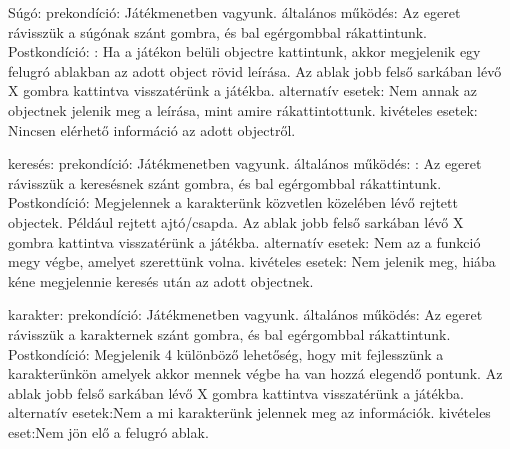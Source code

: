 Súgó:
prekondíció: Játékmenetben vagyunk.
általános működés: Az egeret rávisszük a súgónak szánt gombra, és bal egérgombbal rákattintunk.
Postkondíció: : Ha a játékon belüli objectre kattintunk, akkor megjelenik egy felugró ablakban az adott object rövid leírása. Az ablak jobb felső sarkában lévő X gombra kattintva visszatérünk a játékba.
alternatív esetek: Nem annak az objectnek jelenik meg a leírása, mint amire rákattintottunk.
kivételes esetek: Nincsen elérhető információ az adott objectről.

keresés:
prekondíció: Játékmenetben vagyunk.
általános működés: : Az egeret rávisszük a keresésnek szánt gombra, és bal egérgombbal rákattintunk.
Postkondíció: Megjelennek a karakterünk közvetlen közelében lévő rejtett objectek. Például rejtett ajtó/csapda. Az ablak jobb felső sarkában lévő X gombra kattintva visszatérünk a játékba.
alternatív esetek: Nem az a funkció megy végbe, amelyet szerettünk volna.
kivételes esetek: Nem jelenik meg, hiába kéne megjelennie keresés után az adott objectnek.

karakter:
prekondíció: Játékmenetben vagyunk.
általános működés: Az egeret rávisszük a karakternek szánt gombra, és bal egérgombbal rákattintunk.
Postkondíció: Megjelenik 4 különböző lehetőség, hogy mit fejlesszünk a karakterünkön amelyek akkor mennek végbe ha van hozzá elegendő pontunk. Az ablak jobb felső sarkában lévő X gombra kattintva visszatérünk a játékba.
alternatív esetek:Nem a mi karakterünk jelennek meg az információk.
kivételes eset:Nem jön elő a felugró ablak.
